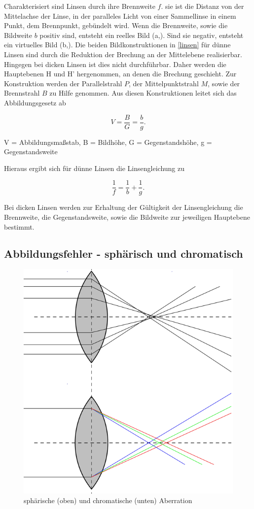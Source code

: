 Charakterisiert sind Linsen durch ihre Brennweite $f$. sie ist die Distanz von der Mittelachse der Linse, in der paralleles Licht von
einer Sammellinse in einem Punkt, dem Brennpunkt, gebündelt wird. Wenn die Brennweite, sowie die Bildweite $b$ positiv sind, entsteht
ein reelles Bild (a,). Sind sie negativ, entsteht ein virtuelles Bild (b,). Die beiden Bildkonstruktionen in \ref{linsen} für dünne
Linsen sind durch die Reduktion der Brechung an der Mittelebene realisierbar. Hingegen bei dicken Linsen ist dies nicht durchführbar.
Daher werden die Hauptebenen H und H' hergenommen, an denen die Brechung geschieht. Zur Konstruktion werden der Parallelstrahl $P$, der
Mittelpunktstrahl $M$, sowie der Brennstrahl $B$ zu Hilfe genommen. Aus diesen Konstruktionen leitet sich das Abbildungsgesetz ab

\begin{formel}
 \begin{equation}
  V = \frac{B}{G} = \frac{b}{g}.
  \label{Abbildung}
 \end{equation}
 \caption*{\small{V = Abbildungsmaßstab, B = Bildhöhe, G = Gegenstandshöhe, g = Gegenstandsweite}}
\end{formel}

Hieraus ergibt sich für dünne Linsen die Linsengleichung zu

\begin{equation}
 \frac1f = \frac1b + \frac1g.
 \label{Linsengleichung}
\end{equation}

Bei dicken Linsen werden zur Erhaltung der Gültigkeit der Linsengleichung die Brennweite, die Gegenstandsweite, sowie die Bildweite 
zur jeweiligen Hauptebene bestimmt. 

\subsection{Abbildungsfehler - sphärisch und chromatisch}

\begin{figure}
\includegraphics[width = 0.5 \textwidth]{pics/408b.png}  
\caption{sphärische (oben) und chromatische (unten) Aberration}
\end{figure}


